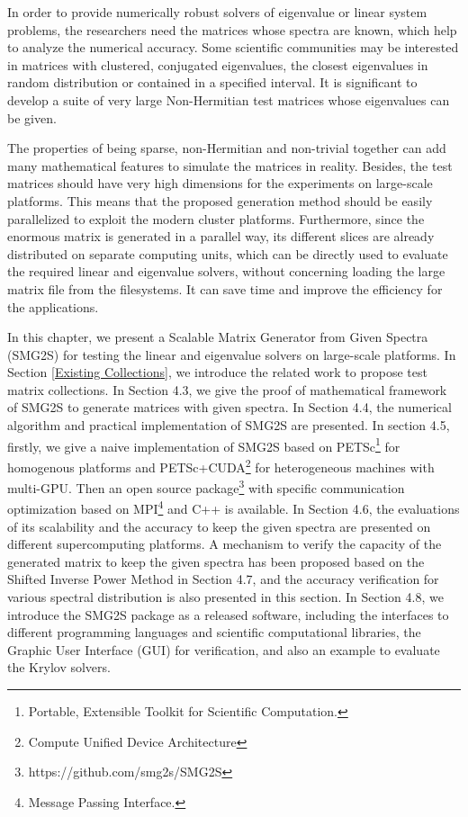 In order to provide numerically robust solvers of eigenvalue or linear system problems, the researchers need the matrices whose spectra are known, which help to analyze the numerical accuracy. Some scientific communities may be interested in matrices with clustered, conjugated eigenvalues, the closest eigenvalues in random distribution or contained in a specified interval. It is significant to develop a suite of very large Non-Hermitian test matrices whose eigenvalues can be given.

The properties of being sparse, non-Hermitian and non-trivial together can add many mathematical features to simulate the matrices in reality. Besides, the test matrices should have very high dimensions for the experiments on large-scale platforms. This means that the proposed generation method should be easily parallelized to exploit the modern cluster platforms. Furthermore, since the enormous matrix is generated in a parallel way, its different slices are already distributed on separate computing units, which can be directly used to evaluate the required linear and eigenvalue solvers, without concerning loading the large matrix file from the filesystems. It can save time and improve the efficiency for the applications.

In this chapter, we present a Scalable Matrix Generator from Given Spectra (SMG2S) for testing the linear and eigenvalue solvers on large-scale platforms. In Section \ref{Existing Collections}, we introduce the related work to propose test matrix collections. In Section 4.3, we give the proof of mathematical framework of SMG2S to generate matrices with given spectra. In Section 4.4, the numerical algorithm and practical implementation of SMG2S are presented. In section 4.5, firstly, we give a naive implementation of SMG2S based on PETSc\footnote{Portable, Extensible Toolkit for Scientific Computation.} for homogenous platforms and PETSc+CUDA\footnote{Compute Unified Device Architecture} for heterogeneous machines with multi-GPU. Then an open source package\footnote{https://github.com/smg2s/SMG2S} with specific communication optimization based on MPI\footnote{Message Passing Interface.} and C++ is available.  In Section 4.6, the evaluations of its scalability and the accuracy to keep the given spectra are presented on different supercomputing platforms.  A mechanism to verify the capacity of the generated matrix to keep the given spectra has been proposed based on the Shifted Inverse Power Method in Section 4.7, and the accuracy verification for various spectral distribution is also presented in this section. In Section 4.8, we introduce the SMG2S package as a released software, including the interfaces to different programming languages and scientific computational libraries, the Graphic User Interface (GUI) for verification, and also an example to evaluate the Krylov solvers. 

